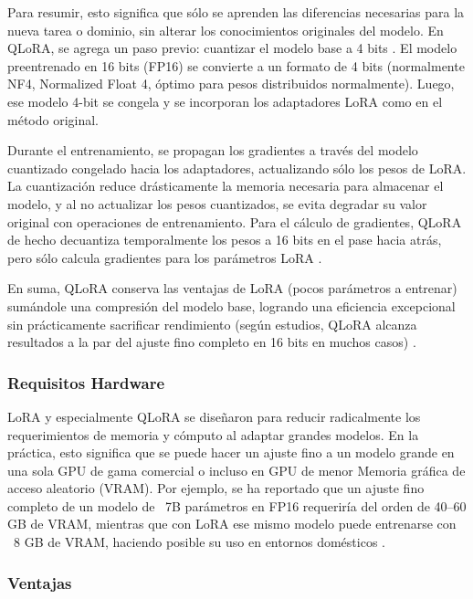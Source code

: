 Para resumir, esto significa que sólo se aprenden las diferencias necesarias para la nueva tarea o dominio, sin alterar los conocimientos originales del modelo. En QLoRA, se agrega un paso previo: cuantizar el modelo base a 4 bits \cite{HuggingFace-LoRA}. El modelo preentrenado en 16 bits (FP16) se convierte a un formato de 4 bits (normalmente NF4, Normalized Float 4, óptimo para pesos distribuidos normalmente). Luego, ese modelo 4-bit se congela y se incorporan los adaptadores LoRA como en el método original.

Durante el entrenamiento, se propagan los gradientes a través del modelo cuantizado congelado hacia los adaptadores, actualizando sólo los pesos de LoRA. La cuantización reduce drásticamente la memoria necesaria para almacenar el modelo, y al no actualizar los pesos cuantizados, se evita degradar su valor original con operaciones de entrenamiento. Para el cálculo de gradientes, QLoRA de hecho decuantiza temporalmente los pesos a 16 bits en el pase hacia atrás, pero sólo calcula gradientes para los parámetros LoRA \cite{HuggingFace-LoRA}.

En suma, QLoRA conserva las ventajas de LoRA (pocos parámetros a entrenar) sumándole una compresión del modelo base, logrando una eficiencia excepcional sin prácticamente sacrificar rendimiento (según estudios, QLoRA alcanza resultados a la par del ajuste fino completo en 16 bits en muchos casos) \cite{HuggingFace-LoRA}.

\subsubsection{Requisitos Hardware}
LoRA y especialmente QLoRA se diseñaron para reducir radicalmente los requerimientos de memoria y cómputo al adaptar grandes modelos. En la práctica, esto significa que se puede hacer un ajuste fino a un modelo grande en una sola GPU de gama comercial o incluso en GPU de menor Memoria gráfica de acceso aleatorio (VRAM). Por ejemplo, se ha reportado que un ajuste fino completo de un modelo de ~7B parámetros en FP16 requeriría del orden de 40–60 GB de VRAM, mientras que con LoRA ese mismo modelo puede entrenarse con ~8 GB de VRAM, haciendo posible su uso en entornos domésticos \cite{Gpu-Finetunin}.

\subsubsection{Ventajas}

